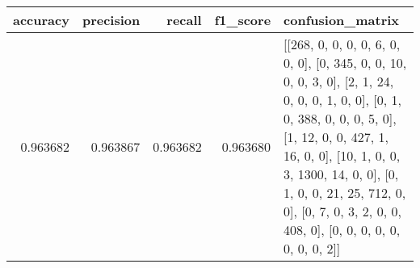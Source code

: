 \begin{tabular}{rrrrl}
\toprule
accuracy & precision & recall & f1_score & confusion_matrix \\
\midrule
0.963682 & 0.963867 & 0.963682 & 0.963680 & [[268, 0, 0, 0, 0, 6, 0, 0, 0], [0, 345, 0, 0, 10, 0, 0, 3, 0], [2, 1, 24, 0, 0, 0, 1, 0, 0], [0, 1, 0, 388, 0, 0, 0, 5, 0], [1, 12, 0, 0, 427, 1, 16, 0, 0], [10, 1, 0, 0, 3, 1300, 14, 0, 0], [0, 1, 0, 0, 21, 25, 712, 0, 0], [0, 7, 0, 3, 2, 0, 0, 408, 0], [0, 0, 0, 0, 0, 0, 0, 0, 2]] \\
\bottomrule
\end{tabular}

